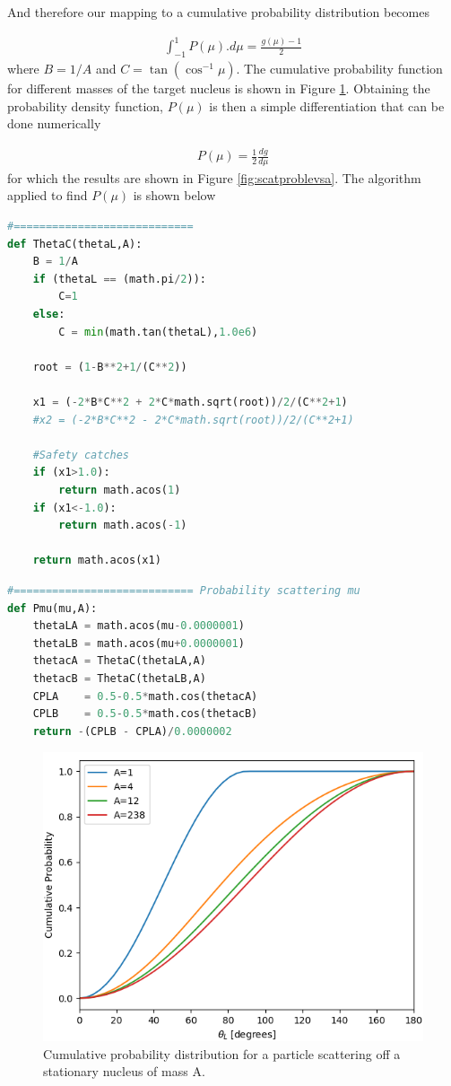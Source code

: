 \documentclass[11pt,letterpaper,titlepage]{article}
\newcommand{\beqn}{\begin{equation}
	\begin{aligned}}
\newcommand{\eeqn}{\end{aligned}
	\end{equation}}
\numberwithin{equation}{section}
\begin{document}
\begin{appendices}
 And therefore our mapping to a cumulative probability distribution becomes
 
 \beqn 
\int_{-1}^1 P(\mu).d\mu = \frac{g(\mu)-1}{2} 
 \eeqn 
 where $B{=}1/A$ and $C{=} \tan ( \cos^{-1} \mu)$. The cumulative probability function for different masses of the target nucleus is shown in Figure \ref{fig:scatanglevsa}. Obtaining the probability density function, $P(\mu)$ is then a simple differentiation that can be done numerically 
 
\beqn
P(\mu)=\frac{1}{2} \frac{dg}{d\mu}
\eeqn  
for which the results are shown in Figure \ref{fig:scatproblevsa}. The algorithm applied to find $P(\mu)$ is shown below

\begin{lstlisting}[language=python]
#============================
def ThetaC(thetaL,A):
    B = 1/A
    if (thetaL == (math.pi/2)):
        C=1
    else:
        C = min(math.tan(thetaL),1.0e6)
    
    root = (1-B**2+1/(C**2))
    
    x1 = (-2*B*C**2 + 2*C*math.sqrt(root))/2/(C**2+1)
    #x2 = (-2*B*C**2 - 2*C*math.sqrt(root))/2/(C**2+1)
    
    #Safety catches
    if (x1>1.0):
        return math.acos(1)
    if (x1<-1.0):
        return math.acos(-1)
    
    return math.acos(x1)
\end{lstlisting}

\newpage
\begin{lstlisting}[language=python]
#============================ Probability scattering mu
def Pmu(mu,A):
    thetaLA = math.acos(mu-0.0000001)
    thetaLB = math.acos(mu+0.0000001)
    thetacA = ThetaC(thetaLA,A)
    thetacB = ThetaC(thetaLB,A)
    CPLA    = 0.5-0.5*math.cos(thetacA)
    CPLB    = 0.5-0.5*math.cos(thetacB)
    return -(CPLB - CPLA)/0.0000002
\end{lstlisting}



\begin{figure}[H]
\centering
\includegraphics[width=0.7\linewidth]{Figures/ScatAnglevsA}
\caption{Cumulative probability distribution for a particle scattering off a stationary nucleus of mass A.}
\label{fig:scatanglevsa}
\end{figure}


\end{appendices}
\end{document}
